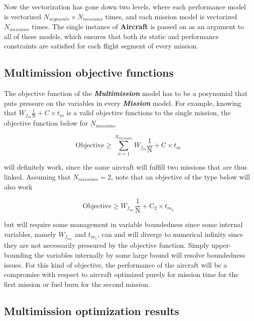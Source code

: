 Now the vectorization has gone down two levels, where each performance model is vectorized $N_{segments} \times N_{missions}$ times,
and each mission model is vectorized $N_{missions}$ times. The single instance of \textbf{Aircraft}
is passed on as an argument to all of these models, which ensures that both its
static and performance constraints are satisfied for each flight segment
of every mission.

\subsection{Multimission objective functions}

The objective function of the \textbf{\textit{Multimission}} model has to be
a posynomial that puts pressure on the variables in every \textbf{\textit{Mission}} model. For example, knowing that
$W_{f_m} \frac{1}{\mathrm{N}} + C \times t_{m}$ is a valid objective functions to the single mission,
the objective function below for $N_{missions}$

\begin{equation}
    \mathrm{Objective} \geq \sum_{n=1}^{N_{missions}} W_{f_m} \frac{1}{\mathrm{N}} + \mathrm{C} \times t_{m}
    \label{e:compObj}
\end{equation}

will definitely work, since the same aircraft will fulfill two missions that are thus linked.
Assuming that $N_{missions} = 2$, note that an objective of the type below will also work

\begin{equation}
    \mathrm{Objective} \geq W_{f_{m_{1}}} \frac{1}{\mathrm{N}} + \mathrm{C}_{2} \times t_{m_{2}}
    \label{e:sepObj}
\end{equation}

but will require some management in variable boundedness since some internal variables,
namely  $W_{f_{m_{2}}}$ and $t_{m_{1}}$, can and will diverge to numerical infinity since they
are not necessarily pressured by the objective function.
Simply upper-bounding the variables
internally by some large bound will resolve boundedness issues. For this kind of objective, the
performance of the aircraft will be a compromise with respect to aircraft optimized purely
for mission time for the first mission or fuel burn for the second mission.

\subsection{Multimission optimization results}

